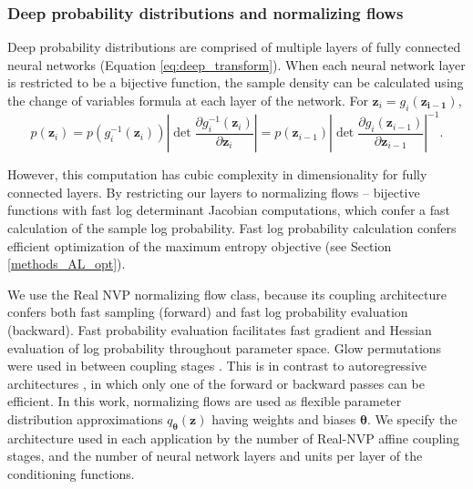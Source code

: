 \documentclass[11pt]{article}
\begin{document}
\subsubsection{Deep probability distributions and normalizing flows}\label{methods_NF}
Deep probability distributions are comprised of multiple layers of fully connected neural networks (Equation \ref{eq:deep_transform}).
When each neural network layer is restricted to be a bijective function, the sample density can be calculated using the change of variables formula at each layer of the network.  For $\mathbf{z}_i = g_i(\mathbf{z_{i-1}})$,
\begin{equation}
p(\mathbf{z}_i) = p(g_i^{-1}(\mathbf{z}_i)) \left| \det \frac{\partial g_i^{-1}(\mathbf{z}_i)}{\partial \mathbf{z}_i} \right| = p(\mathbf{z}_{i-1}) \left| \det \frac{\partial g_i(\mathbf{z}_{i-1})}{\partial \mathbf{z}_{i-1}} \right|^{-1}.
\end{equation}

However, this computation has cubic complexity in dimensionality for fully connected layers.  
By restricting our layers to normalizing flows \cite{rezende2015variational, papamakarios2019normalizing} -- bijective functions with fast log determinant Jacobian computations, which confer a fast calculation of the sample log probability.
Fast log probability calculation confers efficient optimization of the maximum entropy objective (see Section \ref{methods_AL_opt}).

We use the Real NVP \cite{dinh2017density} normalizing flow class, because its coupling architecture confers both fast sampling (forward) and fast log probability evaluation (backward).
Fast probability evaluation  facilitates fast gradient and Hessian evaluation of log probability throughout parameter space.
Glow permutations were used in between coupling stages \cite{kingma2018glow}.
This is in contrast to autoregressive architectures \cite{papamakarios2017masked, kingma2016improved}, in which only one of the forward or backward passes can be efficient.
In this work, normalizing flows are used as flexible parameter distribution approximations $q_{\bm{\theta}}(\mathbf{z})$ having weights and biases $\bm{\theta}$. 
We specify the architecture used in each application by the number of Real-NVP affine coupling stages, and the number of neural network layers and units per layer of the conditioning functions.
\end{document}
